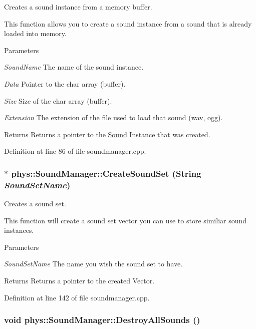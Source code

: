 Creates a sound instance from a memory buffer. 

This function allows you to create a sound instance from a sound that is already loaded into memory. 
\begin{DoxyParams}{Parameters}
\item[{\em SoundName}]The name of the sound instance. \item[{\em Data}]Pointer to the char array (buffer). \item[{\em Size}]Size of the char array (buffer). \item[{\em Extension}]The extension of the file used to load that sound (wav, ogg). \end{DoxyParams}
\begin{DoxyReturn}{Returns}
Returns a pointer to the \hyperlink{classphys_1_1Sound}{Sound} Instance that was created. 
\end{DoxyReturn}


Definition at line 86 of file soundmanager.cpp.

\hypertarget{classphys_1_1SoundManager_afccb11a6f6d9aa9768a185febb0af45a}{
\subsubsection[{CreateSoundSet}]{ $\ast$ phys::SoundManager::CreateSoundSet ({\bf String} {\em SoundSetName})}}
\label{d1/dc4/classphys_1_1SoundManager_afccb11a6f6d9aa9768a185febb0af45a}


Creates a sound set. 

This function will create a sound set vector you can use to store similiar sound instances. 
\begin{DoxyParams}{Parameters}
\item[{\em SoundSetName}]The name you wish the sound set to have. \end{DoxyParams}
\begin{DoxyReturn}{Returns}
Returns a pointer to the created Vector. 
\end{DoxyReturn}


Definition at line 142 of file soundmanager.cpp.

\hypertarget{classphys_1_1SoundManager_a0f523240530abd5ab437c9eace78056a}{
\subsubsection[{DestroyAllSounds}]{\setlength{\rightskip}{0pt plus 5cm}void phys::SoundManager::DestroyAllSounds ()}}
\label{d1/dc4/classphys_1_1SoundManager_a0f523240530abd5ab437c9eace78056a}


